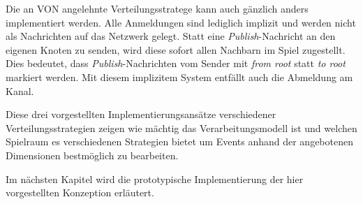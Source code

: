 Die an VON angelehnte Verteilungsstratege kann auch gänzlich anders implementiert werden. Alle Anmeldungen sind lediglich implizit und werden nicht als Nachrichten auf das Netzwerk gelegt. Statt eine \emph{Publish}-Nachricht an den eigenen Knoten zu senden, wird diese sofort allen Nachbarn im Spiel zugestellt. Dies bedeutet, dass \emph{Publish}-Nachrichten vom Sender mit \emph{from root} statt \emph{to root} markiert werden. Mit diesem implizitem System entfällt auch die Abmeldung am Kanal.

Diese drei vorgestellten Implementierungsansätze verschiedener Verteilungsstrategien zeigen wie mächtig das Verarbeitungsmodell ist und welchen Spielraum es verschiedenen Strategien bietet um Events anhand der angebotenen Dimensionen bestmöglich zu bearbeiten.

Im nächsten Kapitel wird die prototypische Implementierung der hier vorgestellten Konzeption erläutert.
